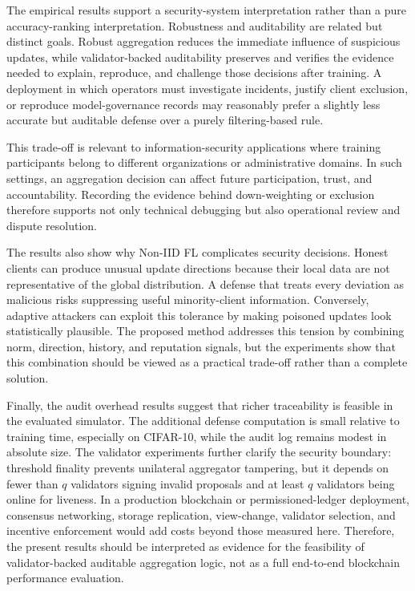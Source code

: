 \documentclass[preprint,authoryear,12pt]{elsarticle}
\begin{document}
The empirical results support a security-system interpretation rather than a pure accuracy-ranking interpretation. Robustness and auditability are related but distinct goals. Robust aggregation reduces the immediate influence of suspicious updates, while validator-backed auditability preserves and verifies the evidence needed to explain, reproduce, and challenge those decisions after training. A deployment in which operators must investigate incidents, justify client exclusion, or reproduce model-governance records may reasonably prefer a slightly less accurate but auditable defense over a purely filtering-based rule.

This trade-off is relevant to information-security applications where training participants belong to different organizations or administrative domains. In such settings, an aggregation decision can affect future participation, trust, and accountability. Recording the evidence behind down-weighting or exclusion therefore supports not only technical debugging but also operational review and dispute resolution.

The results also show why Non-IID FL complicates security decisions. Honest clients can produce unusual update directions because their local data are not representative of the global distribution. A defense that treats every deviation as malicious risks suppressing useful minority-client information. Conversely, adaptive attackers can exploit this tolerance by making poisoned updates look statistically plausible. The proposed method addresses this tension by combining norm, direction, history, and reputation signals, but the experiments show that this combination should be viewed as a practical trade-off rather than a complete solution.

Finally, the audit overhead results suggest that richer traceability is feasible in the evaluated simulator. The additional defense computation is small relative to training time, especially on CIFAR-10, while the audit log remains modest in absolute size. The validator experiments further clarify the security boundary: threshold finality prevents unilateral aggregator tampering, but it depends on fewer than $q$ validators signing invalid proposals and at least $q$ validators being online for liveness. In a production blockchain or permissioned-ledger deployment, consensus networking, storage replication, view-change, validator selection, and incentive enforcement would add costs beyond those measured here. Therefore, the present results should be interpreted as evidence for the feasibility of validator-backed auditable aggregation logic, not as a full end-to-end blockchain performance evaluation.
\end{document}
